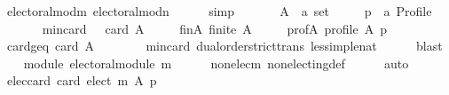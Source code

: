 \begin{isabellebody}
\ electoral{\isacharunderscore}{\kern0pt}mod{\isacharunderscore}{\kern0pt}m\ electoral{\isacharunderscore}{\kern0pt}mod{\isacharunderscore}{\kern0pt}n\isanewline
\ \ \ \ \isamarkupfalse%
\ simp\isanewline
{}\isamarkupfalse%
\isanewline
\ \ \isamarkupfalse%
\isanewline
\ \ \ \ A\ {\isacharcolon}{\kern0pt}{\isacharcolon}{\kern0pt}\ {\isachardoublequoteopen}{\isacharprime}{\kern0pt}a\ set{\isachardoublequoteclose}\ \isanewline
\ \ \ \ p\ {\isacharcolon}{\kern0pt}{\isacharcolon}{\kern0pt}\ {\isachardoublequoteopen}{\isacharprime}{\kern0pt}a\ Profile{\isachardoublequoteclose}\isanewline
\ \ \isamarkupfalse%
\isanewline
\ \ \ \ min{\isacharunderscore}{\kern0pt}{}{\isacharunderscore}{\kern0pt}card{\isacharcolon}{\kern0pt}\ {\isachardoublequoteopen}{}\ {\isacharless}{\kern0pt}\ card\ A{\isachardoublequoteclose}\ \isanewline
\ \ \ \ fin{\isacharunderscore}{\kern0pt}A{\isacharcolon}{\kern0pt}\ {\isachardoublequoteopen}finite\ A{\isachardoublequoteclose}\ \isanewline
\ \ \ \ prof{\isacharunderscore}{\kern0pt}A{\isacharcolon}{\kern0pt}\ {\isachardoublequoteopen}profile\ A\ p{\isachardoublequoteclose}\isanewline
\ \ \isamarkupfalse%
\ card{\isacharunderscore}{\kern0pt}geq{\isacharunderscore}{\kern0pt}{}{\isacharcolon}{\kern0pt}\ {\isachardoublequoteopen}card\ A\ {\isasymge}\ {}{\isachardoublequoteclose}\isanewline
\ \ \ \ \isamarkupfalse%
\ min{\isacharunderscore}{\kern0pt}{}{\isacharunderscore}{\kern0pt}card\ dual{\isacharunderscore}{\kern0pt}order{\isachardot}{\kern0pt}strict{\isacharunderscore}{\kern0pt}trans{}\ less{\isacharunderscore}{\kern0pt}imp{\isacharunderscore}{\kern0pt}le{\isacharunderscore}{\kern0pt}nat\isanewline
\ \ \ \ \isamarkupfalse%
\ blast\isanewline
\ \ \isamarkupfalse%
\ module{\isacharcolon}{\kern0pt}\ {\isachardoublequoteopen}electoral{\isacharunderscore}{\kern0pt}module\ m{\isachardoublequoteclose}\isanewline
\ \ \ \ \isamarkupfalse%
\ non{\isacharunderscore}{\kern0pt}elec{\isacharunderscore}{\kern0pt}m\ non{\isacharunderscore}{\kern0pt}electing{\isacharunderscore}{\kern0pt}def\isanewline
\ \ \ \ \isamarkupfalse%
\ auto\isanewline
\ \ \isamarkupfalse%
\ elec{\isacharunderscore}{\kern0pt}card{\isacharunderscore}{\kern0pt}{}{\isacharcolon}{\kern0pt}\ {\isachardoublequoteopen}card\ {\isacharparenleft}{\kern0pt}elect\ m\ A\ p{\isacharparenright}{\kern0pt}\ {\isacharequal}{\kern0pt}\ {}{\isachardoublequoteclose}\isanewline

\end{isabellebody}
